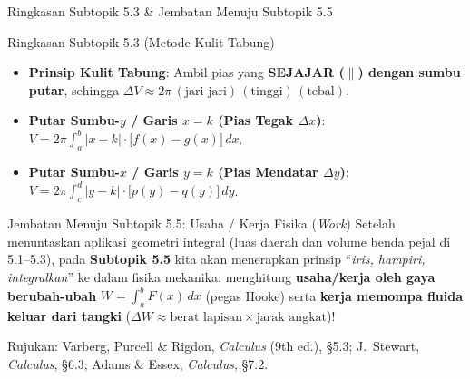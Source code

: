 \documentclass[aspectratio=43,10pt]{beamer}
\begin{document}
\begin{frame}{Ringkasan Subtopik 5.3 \& Jembatan Menuju Subtopik 5.5}
    \begin{block}{Ringkasan Subtopik 5.3 (Metode Kulit Tabung)}
        \scriptsize
        \begin{itemize}\itemsep=2pt
            \item \textbf{Prinsip Kulit Tabung}: Ambil pias yang \textbf{SEJAJAR ($\parallel$) dengan sumbu putar}, sehingga $\Delta V \approx 2\pi\,(\text{jari-jari})\,(\text{tinggi})\,(\text{tebal})$.
            \item \textbf{Putar Sumbu-$y$ / Garis $x = k$ (Pias Tegak $\Delta x$)}: $\displaystyle V = 2\pi\int_{a}^{b} |x - k|\cdot\big[f(x) - g(x)\big]\,dx$.
            \item \textbf{Putar Sumbu-$x$ / Garis $y = k$ (Pias Mendatar $\Delta y$)}: $\displaystyle V = 2\pi\int_{c}^{d} |y - k|\cdot\big[p(y) - q(y)\big]\,dy$.
        \end{itemize}
    \end{block}

    \begin{alertblock}{Jembatan Menuju Subtopik 5.5: Usaha / Kerja Fisika (\textit{Work})}
        \scriptsize
        Setelah menuntaskan aplikasi geometri integral (luas daerah dan volume benda pejal di 5.1--5.3), pada \textbf{Subtopik 5.5} kita akan menerapkan prinsip ``\textit{iris, hampiri, integralkan}'' ke dalam fisika mekanika: menghitung \textbf{usaha/kerja oleh gaya berubah-ubah} $W = \int_a^b F(x)\,dx$ (pegas Hooke) serta \textbf{kerja memompa fluida keluar dari tangki} ($\Delta W \approx \text{berat lapisan}\times\text{jarak angkat}$)!
    \end{alertblock}

    \vskip 2pt
    \tiny\color{SoftGray}
    Rujukan: Varberg, Purcell \& Rigdon, \textit{Calculus} (9th ed.), \S5.3; J.~Stewart, \textit{Calculus}, \S6.3; Adams \& Essex, \textit{Calculus}, \S7.2.
\end{frame}
\end{document}
